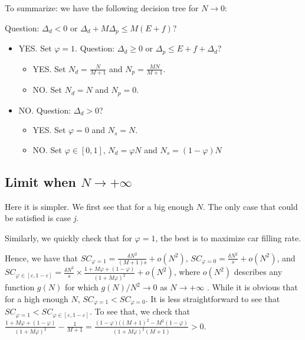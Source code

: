 \documentclass[english, a4paper]{article}
\theoremstyle{plain}
\theoremstyle{definition}
\theoremstyle{remark}
\begin{document}
    To summarize: we have the following decision tree for $N \rightarrow 0$:

    
    Question: $\Delta_d < 0$ or $\Delta_d + M\Delta_p \leq M(E+f)$?
    \begin{itemize}
        \item YES. Set $\varphi = 1$. Question: $\Delta_d \geq 0$ or $\Delta_p \leq E + f + \Delta_d$?
        \begin{itemize}
            \item YES. Set $N_d = \frac{N}{M + 1}$ and $N_p = \frac{MN}{M+1}$.
            \item NO. Set $N_d = N$ and $N_p = 0$.
        \end{itemize}
        \item NO. Question: $\Delta_d > 0$?
        \begin{itemize}
            \item YES. Set $\varphi = 0$ and $N_s = N$.
            \item NO. Set $\varphi \in [0, 1]$, $N_d = \varphi N$ and $N_s = (1-\varphi ) N$
        \end{itemize}
    \end{itemize}

    \subsection{Limit when $N \rightarrow +\infty$}

    Here it is simpler. We first see that for a big enough $N$. The only case that could be satisfied is case \emph{j}.

    Similarly, we quickly check that for $\varphi = 1$, the best is to maximize car filling rate.

    Hence, we have that $SC_{\varphi = 1} = \frac{\delta N^2}{(M+1)s} + o(N^2)$, $SC_{\varphi = 0} = \frac{\delta N^2}{s} + o(N^2)$, and $SC_{\varphi \in [\varepsilon, 1 - \varepsilon]} = \frac{\delta N^2}{s} \times \frac{1 + M\varphi + (1 - \varphi)}{(1 + M\varphi)^2} + o(N^2)$, where $o(N^2)$ describes any function $g(N)$ for which $g(N) / N^2 \rightarrow 0$ as $N \rightarrow +\infty$ . While it is obvious that for a high enough $N$, $SC_{\varphi = 1} < SC_{\varphi = 0}$. It is less straightforward to see that $SC_{\varphi = 1} < SC_{\varphi \in [\varepsilon, 1 - \varepsilon]}$. To see that, we check that $\frac{1 + M\varphi + (1 - \varphi)}{(1 + M\varphi)^2} - \frac{1}{M+ 1} = \frac{(1 -\varphi)((M+1)^2 - M^2(1 -\varphi)}{(1 + M\varphi)^2 (M+1)} > 0$.
\end{document}
